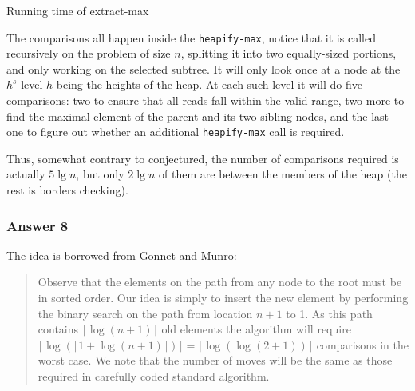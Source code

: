 \documentclass[11pt]{article}
\begin{document}
\begin{algorithm}
  \caption{Running time of extract-max}
  \begin{algorithmic}
    \State {}
    \State {}
    \State {}
    \EndProcedure

    \State {}
     \Then
    \EndIf
     \Then
    \EndIf
     \Then
    \State {}
    \EndIf
    \EndProcedure
  \end{algorithmic}
\end{algorithm}

The comparisons all happen inside the \texttt{heapify-max}, notice that it is
called recursively on the problem of size \(n\), splitting it into two
equally-sized portions, and only working on the selected subtree.  It will
only look once at a node at the \(h^s\) level \(h\) being the heights of the
heap.  At each such level it will do five comparisons: two to ensure that
all reads fall within the valid range, two more to find the maximal element
of the parent and its two sibling nodes, and the last one to figure out
whether an additional \texttt{heapify-max} call is required.

Thus, somewhat contrary to conjectured, the number of comparisons required
is actually \(5\lg n\), but only \(2\lg n\) of them are between the members of
the heap (the rest is borders checking).

\subsubsection{Answer 8}
\label{sec:orgheadline12}
The idea is borrowed from Gonnet and Munro:

\begin{quote}
Observe that the elements on the path from any node to the root must be in
sorted order.  Our idea is simply to insert the new element by performing
the binary search on the path from location \(n+1\) to 1.  As this path
contains \(\lceil \log(n + 1) \rceil\) old elements the algorithm will require
\(\lceil \log(\lceil 1 + \log(n + 1)\rceil)\rceil = \lceil \log(\log(2 + 1))
    \rceil\) comparisons in the worst case.  We note that the number of moves
will be the same as those required in carefully coded standard algorithm.
\end{quote}
\end{document}
